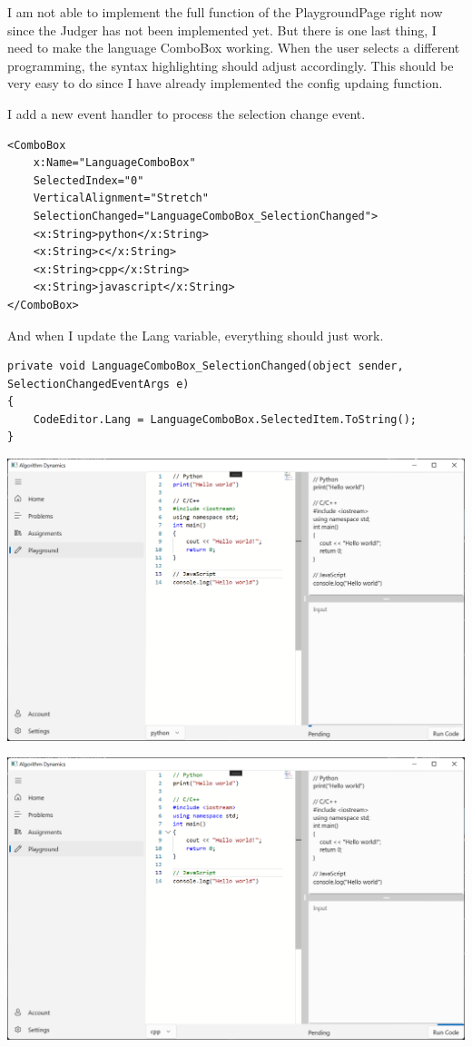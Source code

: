 \documentclass[a4paper]{report}
\begin{document}
I am not able to implement the full function of the PlaygroundPage right now since the Judger has not been implemented yet. But there is one last thing, I need to make the language ComboBox working. When the user selects a different programming, the syntax highlighting should adjust accordingly. This should be very easy to do since I have already implemented the config updaing function.

I add a new event handler to process the selection change event.

\begin{verbatim}
<ComboBox
    x:Name="LanguageComboBox"
    SelectedIndex="0"
    VerticalAlignment="Stretch"
    SelectionChanged="LanguageComboBox_SelectionChanged">
    <x:String>python</x:String>
    <x:String>c</x:String>
    <x:String>cpp</x:String>
    <x:String>javascript</x:String>
</ComboBox>
\end{verbatim}

And when I update the Lang variable, everything should just work.

\begin{verbatim}
private void LanguageComboBox_SelectionChanged(object sender, SelectionChangedEventArgs e)
{
    CodeEditor.Lang = LanguageComboBox.SelectedItem.ToString();
}
\end{verbatim}

\includegraphics[width=\textwidth, height=\textheight, keepaspectratio]{PlaygroundPage-Editor-SyntaxHighlighting-Python}

\includegraphics[width=\textwidth, height=\textheight, keepaspectratio]{PlaygroundPage-Editor-SyntaxHighlighting-Cpp}
\end{document}
